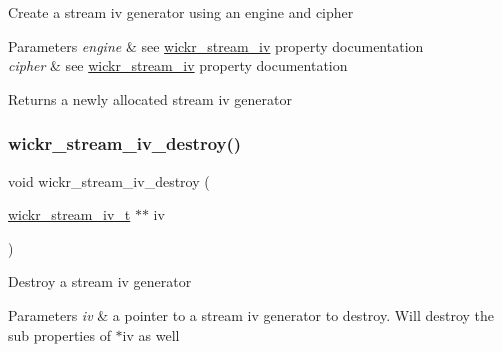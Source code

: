 Create a stream iv generator using an engine and cipher


\begin{DoxyParams}{Parameters}
{\em engine} & see \textquotesingle{}\mbox{\hyperlink{structwickr__stream__iv}{wickr\+\_\+stream\+\_\+iv}}\textquotesingle{} property documentation \\
\hline
{\em cipher} & see \textquotesingle{}\mbox{\hyperlink{structwickr__stream__iv}{wickr\+\_\+stream\+\_\+iv}}\textquotesingle{} property documentation\\
\hline
\end{DoxyParams}
\begin{DoxyReturn}{Returns}
a newly allocated stream iv generator 
\end{DoxyReturn}
\mbox{\label{group__wickr__stream__iv_gad6ac87d891822a866a0d7cad48f79e27}} 
\subsubsection{\texorpdfstring{wickr\+\_\+stream\+\_\+iv\+\_\+destroy()}{wickr\_stream\_iv\_destroy()}}
{\footnotesize\ttfamily void wickr\+\_\+stream\+\_\+iv\+\_\+destroy (\begin{DoxyParamCaption}\item[{\mbox{\hyperlink{structwickr__stream__iv}{wickr\+\_\+stream\+\_\+iv\+\_\+t}} $\ast$$\ast$}]{iv }\end{DoxyParamCaption})}

Destroy a stream iv generator


\begin{DoxyParams}{Parameters}
{\em iv} & a pointer to a stream iv generator to destroy. Will destroy the sub properties of \textquotesingle{}$\ast$iv\textquotesingle{} as well \\
\hline
\end{DoxyParams}
\mbox{\label{group__wickr__stream__iv_gaddcfdc9904ec0ffd32ce8f988aefc484}} 
